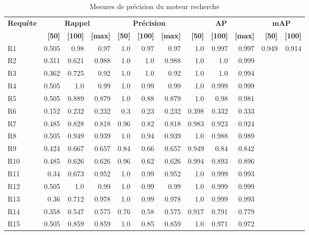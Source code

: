 \begin{table}[H]
\centering
\begin{tabular}{l|rrr|rrr|rrr|rr}
\toprule
\textbf{Requête} & \multicolumn{3}{c}{\textbf{Rappel}} & \multicolumn{3}{c}{\textbf{Précision}} & \multicolumn{3}{c}{\textbf{AP}} & \multicolumn{2}{c}{\textbf{mAP}} \\
 & \textbf{[50]} & \textbf{[100]} & \textbf{[max]} & \textbf{[50]} & \textbf{[100]} & \textbf{[max]} & \textbf{[50]} & \textbf{[100]} & \textbf{[max]} & \textbf{[50]} & \textbf{[100]} \\
\midrule
R1 & 0.505 & 0.98 & 0.97 & 1.0 & 0.97 & 0.97 & 1.0 & 0.997 & 0.997 & \multirow{15}{*}{0.949} & \multirow{15}{*}{0.914} \\
R2 & 0.311 & 0.621 & 0.988 & 1.0 & 1.0 & 0.988 & 1.0 & 1.0 & 0.999 \\
R3 & 0.362 & 0.725 & 0.92 & 1.0 & 1.0 & 0.92 & 1.0 & 1.0 & 0.994 \\
R4 & 0.505 & 1.0 & 0.99 & 1.0 & 0.99 & 0.99 & 1.0 & 0.999 & 0.999 \\
R5 & 0.505 & 0.889 & 0.879 & 1.0 & 0.88 & 0.879 & 1.0 & 0.98 & 0.981 \\
R6 & 0.152 & 0.232 & 0.232 & 0.3 & 0.23 & 0.232 & 0.398 & 0.332 & 0.333 \\
R7 & 0.485 & 0.828 & 0.818 & 0.96 & 0.82 & 0.818 & 0.983 & 0.923 & 0.924 \\
R8 & 0.505 & 0.949 & 0.939 & 1.0 & 0.94 & 0.939 & 1.0 & 0.988 & 0.989 \\
R9 & 0.424 & 0.667 & 0.657 & 0.84 & 0.66 & 0.657 & 0.949 & 0.84 & 0.842 \\
R10 & 0.485 & 0.626 & 0.626 & 0.96 & 0.62 & 0.626 & 0.994 & 0.893 & 0.896 \\
R11 & 0.34 & 0.673 & 0.952 & 1.0 & 0.99 & 0.952 & 1.0 & 0.999 & 0.993 \\
R12 & 0.505 & 1.0 & 0.99 & 1.0 & 0.99 & 0.99 & 1.0 & 0.999 & 0.999 \\
R13 & 0.36 & 0.712 & 0.978 & 1.0 & 0.99 & 0.978 & 1.0 & 0.999 & 0.993 \\
R14 & 0.358 & 0.547 & 0.575 & 0.76 & 0.58 & 0.575 & 0.917 & 0.791 & 0.779 \\
R15 & 0.505 & 0.859 & 0.859 & 1.0 & 0.85 & 0.859 & 1.0 & 0.971 & 0.972 \\
\bottomrule
\end{tabular}
\caption{Mesures de précision du moteur recherche}
\label{tab:results}
\end{table}
